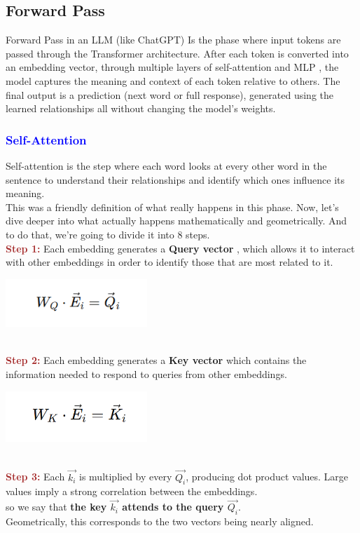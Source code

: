 \documentclass[12pt]{article}
\begin{document}
\subsection{Forward Pass}
Forward Pass in an LLM (like ChatGPT) Is the phase where input tokens are passed through the Transformer architecture. After each token is converted into an embedding vector, through multiple layers of self-attention and MLP , the model captures the meaning and context of each token relative to others. The final output is a prediction (next word or full response), generated using the learned relationships all without changing the model’s weights.
\textcolor{blue}{\subsubsection{Self-Attention}}
Self-attention is the step where each word looks at every other word in the sentence to understand their relationships and identify which ones influence its meaning.\\This was a friendly definition of what really happens in this phase. Now, let's dive deeper into what actually happens mathematically and geometrically. And to do that, we’re going to divide it into 8 steps.\\
\textcolor{brown}{\textbf{Step 1:}} Each embedding generates a \textbf{Query vector }, which allows it to interact with other embeddings in order to identify those that are most related to it.\\
\begin{center}
\includegraphics[width=0.4\textwidth]{images/formula1.png}
\end{center}
\textcolor{brown}{\textbf{\\Step 2:}} Each embedding generates a \textbf{Key vector } which contains the information needed to respond to queries from other embeddings.\\
\begin{center}
\includegraphics[width=0.4\textwidth]{images/formula2.png}
\end{center}
\textcolor{brown}{\textbf{\\Step 3:}} Each \textbf{\(\overrightarrow{k_i}\)} is multiplied by every \textbf{\(\overrightarrow{Q_i}\)}, producing dot product values. Large values imply a strong correlation between the embeddings.\\so we say that \textbf{the key \(\overrightarrow{k_i}\) attends to the query \(\overrightarrow{Q_i}\)}.\\Geometrically, this corresponds to the two vectors being nearly aligned.\\
\newpage
\end{document}
